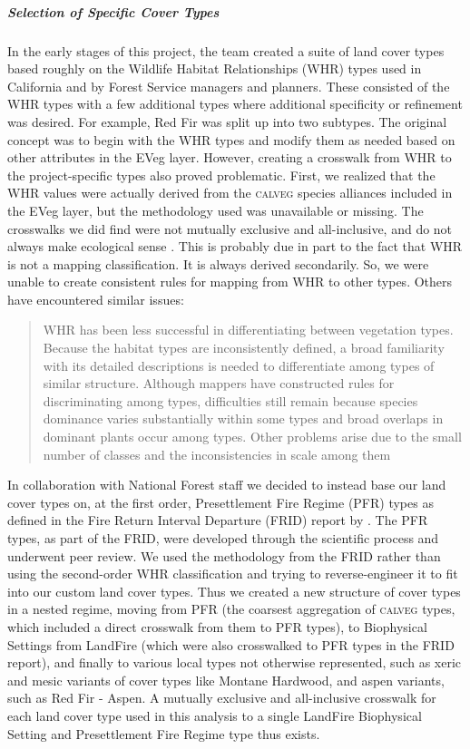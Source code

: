 \subparagraph{Selection of Specific Cover Types}
In the early stages of this project, the team created a suite of land cover types based roughly on the Wildlife Habitat Relationships (WHR) types used in California and by Forest Service managers and planners. These consisted of the WHR types with a few additional types where additional specificity or refinement was desired. For example, Red Fir was split up into two subtypes. The original concept was to begin with the WHR types and modify them as needed based on other attributes in the EVeg layer. However, creating a crosswalk from WHR to the project-specific types also proved problematic. First, we realized that the WHR values were actually derived from the \textsc{calveg} species alliances included in the EVeg layer, but the methodology used was unavailable or missing. The crosswalks we did find were not mutually exclusive and all-inclusive, and do not always make ecological sense \citep{Keeler-Wolf2007,DeBecker1988,Game2005}. This is probably due in part to the fact that WHR is not a mapping classification. It is always derived secondarily. So, we were unable to create consistent rules for mapping from WHR to other types. Others have encountered similar issues:
%
\begin{quote}
WHR has been less successful in differentiating between vegetation types. Because the habitat types are inconsistently defined, a broad familiarity with its detailed descriptions is needed to differentiate among types of similar structure. Although mappers have constructed rules for discriminating among types, difficulties still remain because species dominance varies substantially within some types and broad overlaps in dominant plants occur among types. Other problems arise due to the small number of classes and the inconsistencies in scale among them \citep[p.~23]{Keeler-Wolf2007}
\end{quote}
%
In collaboration with National Forest staff we decided to instead base our land cover types on, at the first order, Presettlement Fire Regime (PFR) types as defined in the Fire Return Interval Departure (FRID) report by \citet{VandeWater2011}. The PFR types, as part of the FRID, were developed through the scientific process and underwent peer review. We used the methodology from the FRID rather than using the second-order WHR classification and trying to reverse-engineer it to fit into our custom land cover types. Thus we created a new structure of cover types in a nested regime, moving from PFR (the coarsest aggregation of \textsc{calveg} types, which included a direct crosswalk from them to PFR types), to Biophysical Settings from LandFire (which were also crosswalked to PFR types in the FRID report), and finally to various local types not otherwise represented, such as xeric and mesic variants of cover types like Montane Hardwood, and aspen variants, such as Red Fir - Aspen. A mutually exclusive and all-inclusive crosswalk for each land cover type used in this analysis to a single LandFire Biophysical Setting and Presettlement Fire Regime type thus exists.

